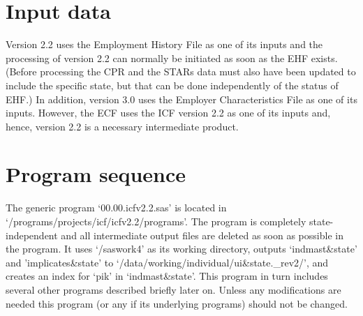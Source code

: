 \section{Input data}

Version 2.2 uses the Employment History File as one of its inputs and the
processing of version 2.2 can normally be initiated as soon as the EHF
exists. (Before processing the CPR and the STARs data must also have been
updated to include the specific state, but that can be done independently of
the status of EHF.) In addition, version 3.0 uses the Employer
Characteristics File as one of its inputs. However, the ECF uses the ICF
version 2.2 as one of its inputs and, hence, version 2.2 is a necessary
intermediate product.

\section{Program sequence}

The generic program `00.00.icfv2.2.sas' is located in
`/programs/projects/icf/icfv2.2/programs'. The program is completely
state-independent and all intermediate output files are deleted as soon as
possible in the program. It uses `/saswork4' as its working directory,
outputs `indmast{\&}state' and 'implicates{\&}state' to
`/data/working/individual/ui{\&}state.{\_}rev2/', and creates an index for
`pik' in `indmast{\&}state'. This program in turn includes several other
programs described briefly later on. Unless any modifications are needed
this program (or any if its underlying programs) should not be changed.

